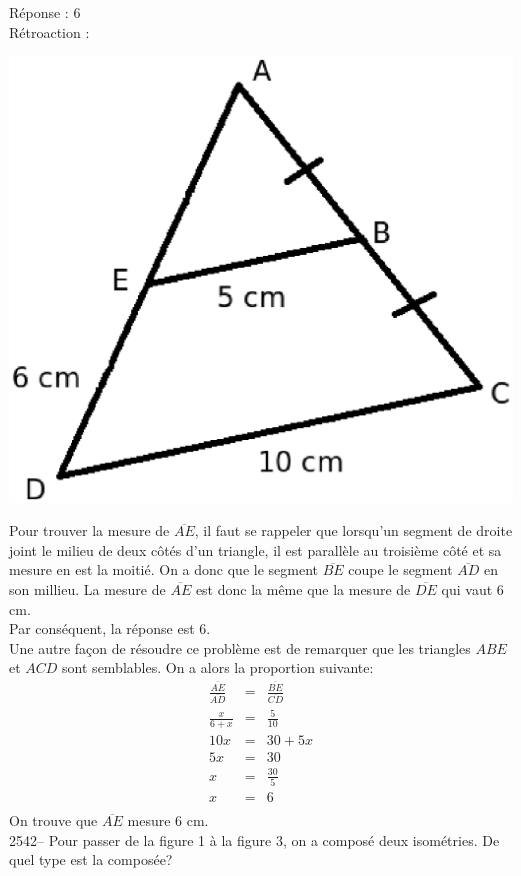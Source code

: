 \documentclass[letterpaper, 12pt]{article}
\begin{document}
R\'eponse : 6\\

R\'etroaction :\\
\begin{center}
 \includegraphics[width=8 cm,bb=0 439 538 842]{Q2541.eps}
\end{center}
Pour trouver la mesure de $\overline{AE}$, il faut se rappeler que lorsqu'un segment de droite joint le milieu de deux c\^ot\'es d'un triangle, il est parall\`ele au troisi\`eme c\^ot\'e et sa mesure en est la moiti\'e. On a donc que le segment $\overline{BE}$ coupe le segment $\overline{AD}$ en son millieu. La mesure de $\overline{AE}$ est donc la m\^eme que la mesure de $\overline{DE}$ qui vaut 6 cm. \\
Par cons\'equent, la r\'eponse est 6.\\
Une autre fa\c con de r\'esoudre ce probl\`eme est de remarquer que les triangles $ABE$ et $ACD$ sont semblables. On a alors la proportion suivante:
\begin{eqnarray*}
 \frac{\overline{AE}}{\overline{AD}}&=&\frac{\overline{BE}}{\overline{CD}}\\[2mm]
 \frac{x}{6+x}&=&\frac{5}{10}\\[2mm]
 10x&=&30+5x\\[2mm]
 5x&=&30\\
 x&=&\frac{30}{5}\\
x&=&6\\
\end{eqnarray*}
On trouve que $\overline{AE}$ mesure 6 cm.\\





2542-- Pour passer de la figure 1  \`a la figure 3, on a compos\'e deux isom\'etries. De quel type est la compos\'ee?\\
\end{document}
